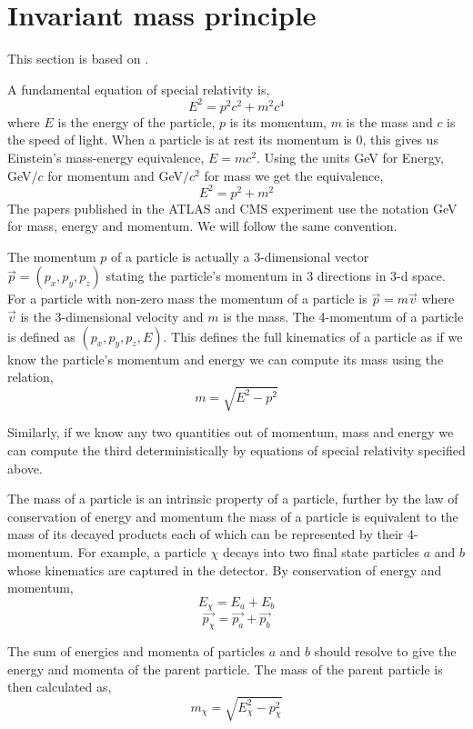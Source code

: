 \documentclass[final,3p,times,twocolumn]{elsarticle}
\begin{document}
\appendix

\section{Invariant mass principle}

\label{AppA}

This section is based on \cite{RM}.

A fundamental equation of special relativity is, $$ E^2 = p^2c^2 + m^2c^4 $$ where $E$ is the energy of the particle, $p$ is its momentum, $m$ is the mass and $c$ is the speed of light. When a particle is at rest its momentum is 0, this gives us Einstein's mass-energy equivalence, $E = mc^2$.  Using the units GeV for Energy, GeV$/c$ for momentum and GeV$/c^2$ for mass we get the equivalence,  $$E^2 = p^2 + m^2 $$ The papers published in the ATLAS and CMS experiment use the notation GeV for mass, energy and momentum. We will follow the same convention.

The momentum $p$ of a particle is actually a 3-dimensional vector $\overrightarrow{p} = (p_{x}, p_{y}, p_{z})$ stating the particle's momentum in 3 directions in 3-d space. For a particle with non-zero mass the momentum of a particle is $\overrightarrow{p} = m\overrightarrow{v}$ where $\overrightarrow{v}$ is the 3-dimensional velocity and $m$ is the mass. The 4-momentum of a particle is defined as $(p_{x}, p_{y}, p_{z}, E)$. This defines the full kinematics of a particle as if we know the particle's momentum and energy we can compute its mass using the relation, $$ m = \sqrt{E^2 - p^2} $$

Similarly, if we know any two quantities out of momentum, mass and energy we can compute the third deterministically by equations of special relativity specified above. 

The mass of a particle is an intrinsic property of a particle, further by the law of conservation of energy and momentum the mass of a particle is equivalent to the mass of its decayed products each of which can be represented by their 4-momentum. For example, a particle $\chi$ decays into two final state particles $a$ and $b$ whose kinematics are captured in the detector. By conservation of energy and momentum, $$E_{\chi} = E_{a} + E_{b}$$ $$\overrightarrow{p_{\chi}} = \overrightarrow{p_{a}} + \overrightarrow{p_{b}}$$

The sum of energies and momenta of particles $a$ and $b$ should resolve to give the energy and momenta of the parent particle. The mass of the parent particle is then calculated as, $$ m_{\chi} = \sqrt{E_{\chi}^2 - p_{\chi}^2} $$ 
\end{document}
